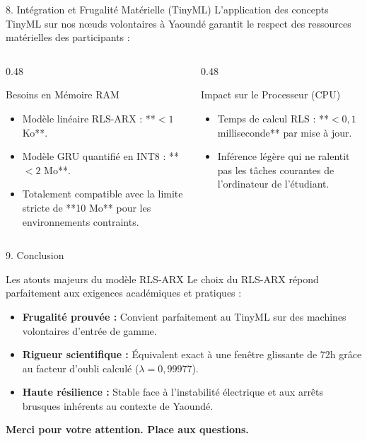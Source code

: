 \documentclass[10pt,aspectratio=169]{beamer}
\begin{document}
\begin{frame}{8. Intégration et Frugalité Matérielle (TinyML)}
  L'application des concepts TinyML sur nos nœuds volontaires à Yaoundé garantit le respect des ressources matérielles des participants :
  
  \vspace{0.5em}
  \begin{columns}[T]
    \begin{column}{0.48\textwidth}
      \begin{block}{Besoins en Mémoire RAM}
        \begin{itemize}
          \item Modèle linéaire RLS-ARX : **$< 1$ Ko**.
          \item Modèle GRU quantifié en INT8 : **$< 2$ Mo**.
          \item Totalement compatible avec la limite stricte de **10 Mo** pour les environnements contraints.
        \end{itemize}
      \end{block}
    \end{column}
    
    \begin{column}{0.48\textwidth}
      \begin{block}{Impact sur le Processeur (CPU)}
        \begin{itemize}
          \item Temps de calcul RLS : **$< 0,1$ milliseconde** par mise à jour.
          \item Inférence légère qui ne ralentit pas les tâches courantes de l'ordinateur de l'étudiant.
        \end{itemize}
      \end{block}
    \end{column}
  \end{columns}
\end{frame}

\begin{frame}{9. Conclusion}
  \begin{block}{Les atouts majeurs du modèle RLS-ARX}
    Le choix du RLS-ARX répond parfaitement aux exigences académiques et pratiques :
    \begin{itemize}
      \item \textbf{Frugalité prouvée :} Convient parfaitement au TinyML sur des machines volontaires d'entrée de gamme.
      \item \textbf{Rigueur scientifique :} Équivalent exact à une fenêtre glissante de 72h grâce au facteur d'oubli calculé ($\lambda = 0,99977$).
      \item \textbf{Haute résilience :} Stable face à l'instabilité électrique et aux arrêts brusques inhérents au contexte de Yaoundé.
    \end{itemize}
  \end{block}
  
  \centering
  \vspace{1.5em}
  \Large\textbf{Merci pour votre attention. Place aux questions.}
\end{frame}
\end{document}
